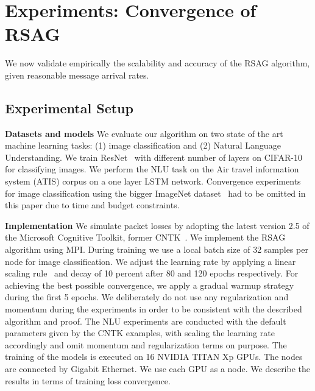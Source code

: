 \documentclass{article}
\renewcommand{\paragraph}[1]{\noindent\textbf{#1}}
\newcounter{ass_counter}
\newcounter{thm_counter}
\begin{document}

\section{Experiments: Convergence of RSAG}

We now validate empirically the scalability and accuracy 
of the RSAG algorithm, given reasonable message arrival rates. 

\subsection{Experimental Setup}

\paragraph{Datasets and models} We evaluate our algorithm on two state of the art machine learning tasks: (1) image classification and (2) Natural Language Understanding. We train ResNet~\cite{he2016deep} with different number of layers on CIFAR-10~\cite{krizhevsky2009learning} for classifying images. We perform the NLU task on the Air travel information system (ATIS) corpus on a one layer LSTM network. Convergence experiments for image classification using the bigger ImageNet dataset~\cite{russakovsky2015imagenet} had to be omitted in this paper due to time and budget constraints.

\paragraph{Implementation} We simulate packet losses by adopting the latest version 2.5 of the Microsoft Cognitive Toolkit, former CNTK~\cite{seide2016cntk}. We implement the RSAG algorithm using MPI. During training we use a local batch size of 32 samples per node for image classification. We adjust the learning rate by applying a linear scaling rule~\cite{goyal2017accurate} and decay of 10 percent after 80 and 120 epochs respectively. For achieving the best possible convergence, we apply a gradual warmup strategy~\cite{goyal2017accurate} during the first 5 epochs. We deliberately do not use any regularization and momentum during the experiments in order to be consistent with the described algorithm and proof. The NLU experiments are conducted with the default parameters given by the CNTK examples, with scaling the learning rate accordingly and omit momentum and regularization terms on purpose.
The training of the models is executed on 16 NVIDIA TITAN Xp GPUs. The nodes are connected by Gigabit Ethernet. We use each GPU as a node.
We describe the results in terms of training loss convergence. 
\end{document}
